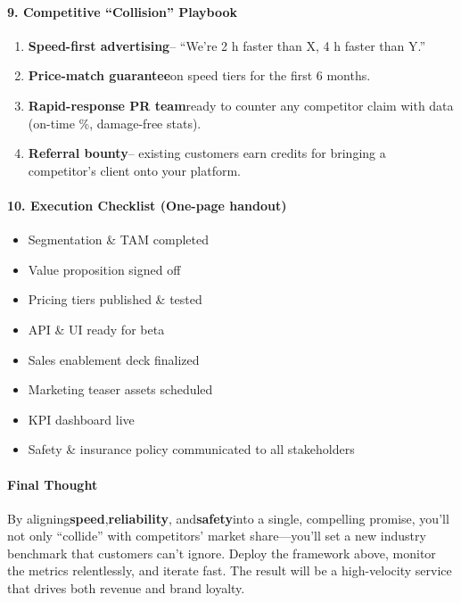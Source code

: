 \begin{persistbenchsample}[title={GPT-OSS-120B -- Cos Similarity Partitioned -> Partitioned -- Sample 3 (+3 Improvement)}]
\paragraph{9. Competitive ``Collision'' Playbook}
\begin{enumerate}
  \item \textbf{Speed-first advertising}-- ``We're 2 h faster than X, 4 h faster than Y.''
  \item \textbf{Price-match guarantee}on speed tiers for the first 6 months.
  \item \textbf{Rapid-response PR team}ready to counter any competitor claim with data (on-time \%, damage-free stats).
  \item \textbf{Referral bounty}-- existing customers earn credits for bringing a competitor's client onto your platform.
\end{enumerate}

\paragraph{10. Execution Checklist (One-page handout)}
\begin{itemize}
  \item [ ] Segmentation \& TAM completed
  \item [ ] Value proposition signed off
  \item [ ] Pricing tiers published \& tested
  \item [ ] API \& UI ready for beta
  \item [ ] Sales enablement deck finalized
  \item [ ] Marketing teaser assets scheduled
  \item [ ] KPI dashboard live
  \item [ ] Safety \& insurance policy communicated to all stakeholders
\end{itemize}

\paragraph{Final Thought}
By aligning\textbf{speed},\textbf{reliability}, and\textbf{safety}into a single, compelling promise, you'll not only ``collide'' with competitors' market share---you'll set a new industry benchmark that customers can't ignore. Deploy the framework above, monitor the metrics relentlessly, and iterate fast. The result will be a high-velocity service that drives both revenue and brand loyalty.


\end{persistbenchsample}

